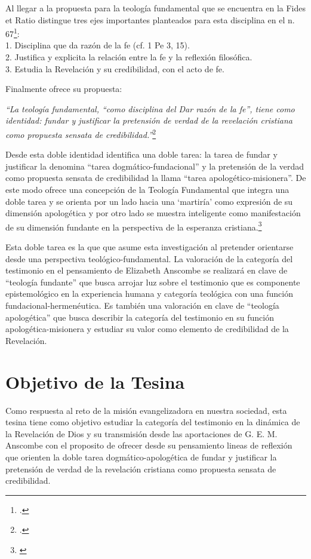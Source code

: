 \documentclass[11pt]{article}
\begin{document}
Al llegar a la propuesta para la teología fundamental que se encuentra en la Fides et Ratio distingue tres ejes importantes planteados para esta disciplina en el n. 67\footcite[49]{ninotTF}:\\1. Disciplina que da razón de la fe (cf. 1 Pe 3, 15).\\
2. Justifica y explicita la relación entre la fe y la reflexión filosófica.\\
3. Estudia la Revelación y su credibilidad, con el acto de fe.

Finalmente ofrece su propuesta:

\emph{
``La teología fundamental, ``como disciplina del Dar razón de la fe'', tiene como identidad: fundar y justificar la pretensión de verdad de la revelación cristiana como propuesta sensata de credibilidad.''}\footcite[72]{ninotTF}

Desde esta doble identidad identifica una doble tarea: la tarea de fundar y justificar la denomina ``tarea dogmático-fundacional'' y la pretensión de la verdad como propuesta sensata de credibilidad la llama ``tarea apologético-misionera''. De este modo ofrece una concepción de la Teología Fundamental que integra una doble tarea y se orienta por un lado hacia una `martiría' como expresión de su dimensión apologética y por otro lado se muestra inteligente como manifestación de su dimensión fundante en la perspectiva de la esperanza cristiana.\footnote{\cite[72]{ninotTF}}

Esta doble tarea es la que que asume esta investigación al pretender orientarse desde una perspectiva teológico-fundamental. La valoración de la categoría del testimonio en el pensamiento de Elizabeth Anscombe se realizará en clave de ``teología fundante'' que busca arrojar luz sobre el testimonio que es componente epistemológico en la experiencia humana y categoría teológica con una función fundacional-hermenéutica. Es también una valoración en clave de ``teología apologética'' que busca describir la categoría del testimonio en su función apologética-misionera y estudiar su valor como elemento de credibilidad de la Revelación.


\printbibliography[title={Referencias usadas en la presentación:},keyword=pres]

\part*{Objetivo de la Tesina}

Como respuesta al reto de la misión evangelizadora en nuestra sociedad, esta tesina tiene como objetivo estudiar la categoría del testimonio en la dinámica de la Revelación de Dios y su transmisión desde las aportaciones de G. E. M. Anscombe con el proposito de ofrecer desde su pensamiento lineas de reflexión que orienten la doble tarea dogmático-apologética de fundar y justificar la pretensión de verdad de la revelación cristiana como propuesta sensata de credibilidad.
\end{document}
